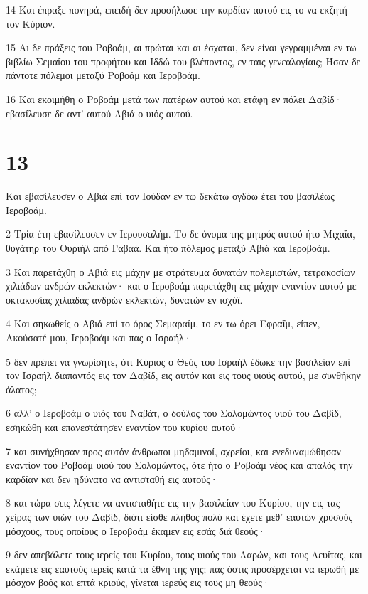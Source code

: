 \par 14 Και έπραξε πονηρά, επειδή δεν προσήλωσε την καρδίαν αυτού εις το να εκζητή τον Κύριον.
\par 15 Αι δε πράξεις του Ροβοάμ, αι πρώται και αι έσχαται, δεν είναι γεγραμμέναι εν τω βιβλίω Σεμαΐου του προφήτου και Ιδδώ του βλέποντος, εν ταις γενεαλογίαις; Ήσαν δε πάντοτε πόλεμοι μεταξύ Ροβοάμ και Ιεροβοάμ.
\par 16 Και εκοιμήθη ο Ροβοάμ μετά των πατέρων αυτού και ετάφη εν πόλει Δαβίδ· εβασίλευσε δε αντ' αυτού Αβιά ο υιός αυτού.

\chapter{13}

\par Και εβασίλευσεν ο Αβιά επί τον Ιούδαν εν τω δεκάτω ογδόω έτει του βασιλέως Ιεροβοάμ.
\par 2 Τρία έτη εβασίλευσεν εν Ιερουσαλήμ. Το δε όνομα της μητρός αυτού ήτο Μιχαΐα, θυγάτηρ του Ουριήλ από Γαβαά. Και ήτο πόλεμος μεταξύ Αβιά και Ιεροβοάμ.
\par 3 Και παρετάχθη ο Αβιά εις μάχην με στράτευμα δυνατών πολεμιστών, τετρακοσίων χιλιάδων ανδρών εκλεκτών· και ο Ιεροβοάμ παρετάχθη εις μάχην εναντίον αυτού με οκτακοσίας χιλιάδας ανδρών εκλεκτών, δυνατών εν ισχύϊ.
\par 4 Και σηκωθείς ο Αβιά επί το όρος Σεμαραΐμ, το εν τω όρει Εφραΐμ, είπεν, Ακούσατέ μου, Ιεροβοάμ και πας ο Ισραήλ·
\par 5 δεν πρέπει να γνωρίσητε, ότι Κύριος ο Θεός του Ισραήλ έδωκε την βασιλείαν επί τον Ισραήλ διαπαντός εις τον Δαβίδ, εις αυτόν και εις τους υιούς αυτού, με συνθήκην άλατος;
\par 6 αλλ' ο Ιεροβοάμ ο υιός του Ναβάτ, ο δούλος του Σολομώντος υιού του Δαβίδ, εσηκώθη και επανεστάτησεν εναντίον του κυρίου αυτού·
\par 7 και συνήχθησαν προς αυτόν άνθρωποι μηδαμινοί, αχρείοι, και ενεδυναμώθησαν εναντίον του Ροβοάμ υιού του Σολομώντος, ότε ήτο ο Ροβοάμ νέος και απαλός την καρδίαν και δεν ηδύνατο να αντισταθή εις αυτούς·
\par 8 και τώρα σεις λέγετε να αντισταθήτε εις την βασιλείαν του Κυρίου, την εις τας χείρας των υιών του Δαβίδ, διότι είσθε πλήθος πολύ και έχετε μεθ' εαυτών χρυσούς μόσχους, τους οποίους ο Ιεροβοάμ έκαμεν εις εσάς διά θεούς·
\par 9 δεν απεβάλετε τους ιερείς του Κυρίου, τους υιούς του Ααρών, και τους Λευΐτας, και εκάμετε εις εαυτούς ιερείς κατά τα έθνη της γης; πας όστις προσέρχεται να ιερωθή με μόσχον βοός και επτά κριούς, γίνεται ιερεύς εις τους μη θεούς·
